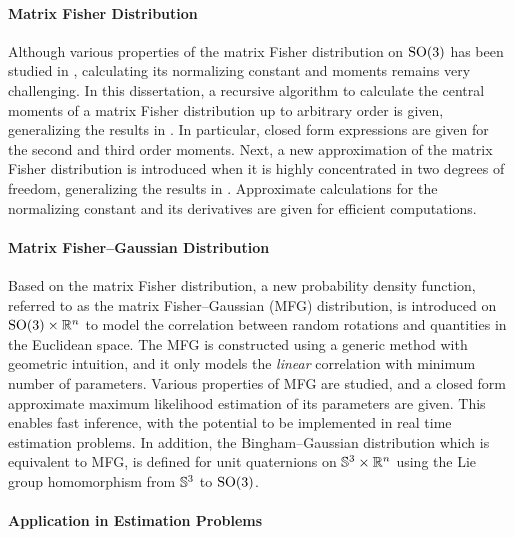 \paragraph{Matrix Fisher Distribution}

Although various properties of the matrix Fisher distribution on $\mathrm{SO}(3)$ has been studied in \cite{downs1972orientation,khatri1977mises,lee2018bayesian}, calculating its normalizing constant and moments remains very challenging.
In this dissertation, a recursive algorithm to calculate the central moments of a matrix Fisher distribution up to arbitrary order is given, generalizing the results in \cite{khatri1977mises,lee2018bayesian}.
In particular, closed form expressions are given for the second and third order moments.
Next, a new approximation of the matrix Fisher distribution is introduced when it is highly concentrated in two degrees of freedom, generalizing the results in \cite{lee2018bayesian-b}.
Approximate calculations for the normalizing constant and its derivatives are given for efficient computations.

\paragraph{Matrix Fisher--Gaussian Distribution}

Based on the matrix Fisher distribution, a new probability density function, referred to as the matrix Fisher--Gaussian (MFG) distribution, is introduced on $\mathrm{SO}(3)\times \mathbb{R}^n$ to model the correlation between random rotations and quantities in the Euclidean space.
The MFG is constructed using a generic method with geometric intuition, and it only models the \textit{linear} correlation with minimum number of parameters.
Various properties of MFG are studied, and a closed form approximate maximum likelihood estimation of its parameters are given.
This enables fast inference, with the potential to be implemented in real time estimation problems.
In addition, the Bingham--Gaussian distribution which is equivalent to MFG, is defined for unit quaternions on $\mathbb{S}^3\times \mathbb{R}^n$ using the Lie group homomorphism from $\mathbb{S}^3$ to $\mathrm{SO}(3)$.

\paragraph{Application in Estimation Problems}

